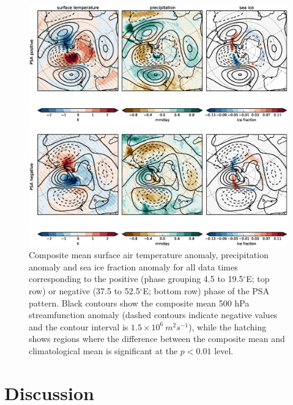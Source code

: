 \begin{figure}
\begin{center}
\includegraphics[width=1\columnwidth]{figures/psa/Figure4-10.eps}
\caption[Composite mean surface air temperature anomaly, precipitation anomaly and sea ice fraction anomaly for all data times corresponding to the positive or negative phase of the PSA pattern]{\label{fig:surface_composites}
Composite mean surface air temperature anomaly, precipitation anomaly and sea ice fraction anomaly for all data times corresponding to the positive (phase grouping 4.5 to 19.5$^{\circ}$E; top row) or negative (37.5 to 52.5$^{\circ}$E; bottom row) phase of the PSA pattern. Black contours show the composite mean 500 hPa streamfunction anomaly (dashed contours indicate negative values and the contour interval is $1.5 \times 10^6 \: m^2 s^{-1}$), while the hatching shows regions where the difference between the composite mean and climatological mean is significant at the $p < 0.01$ level.%
}
\end{center}
\end{figure}



\section{Discussion}

